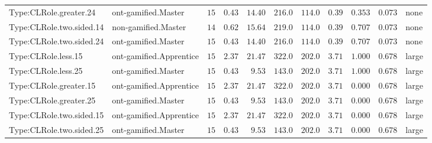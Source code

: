 \documentclass[6pt,a4paper]{article}
\begin{document}
{\begin{longtable}{llrrrrrrrrl}
Type:CLRole.greater.24&ont-gamified.Master&$15$&$0.43$&$14.40$&$216.0$&$114.0$&$ 0.39$&$0.353$&$0.073$&none\tabularnewline
Type:CLRole.two.sided.14&non-gamified.Master&$14$&$0.62$&$15.64$&$219.0$&$114.0$&$ 0.39$&$0.707$&$0.073$&none\tabularnewline
Type:CLRole.two.sided.24&ont-gamified.Master&$15$&$0.43$&$14.40$&$216.0$&$114.0$&$ 0.39$&$0.707$&$0.073$&none\tabularnewline
Type:CLRole.less.15&ont-gamified.Apprentice&$15$&$2.37$&$21.47$&$322.0$&$202.0$&$ 3.71$&$1.000$&$0.678$&large\tabularnewline
Type:CLRole.less.25&ont-gamified.Master&$15$&$0.43$&$ 9.53$&$143.0$&$202.0$&$ 3.71$&$1.000$&$0.678$&large\tabularnewline
Type:CLRole.greater.15&ont-gamified.Apprentice&$15$&$2.37$&$21.47$&$322.0$&$202.0$&$ 3.71$&$0.000$&$0.678$&large\tabularnewline
Type:CLRole.greater.25&ont-gamified.Master&$15$&$0.43$&$ 9.53$&$143.0$&$202.0$&$ 3.71$&$0.000$&$0.678$&large\tabularnewline
\newpage
Type:CLRole.two.sided.15&ont-gamified.Apprentice&$15$&$2.37$&$21.47$&$322.0$&$202.0$&$ 3.71$&$0.000$&$0.678$&large\tabularnewline
Type:CLRole.two.sided.25&ont-gamified.Master&$15$&$0.43$&$ 9.53$&$143.0$&$202.0$&$ 3.71$&$0.000$&$0.678$&large\tabularnewline
\hline
\end{longtable}}
\end{document}
